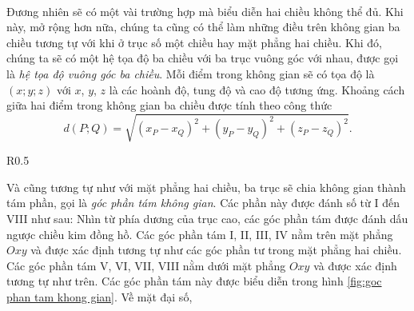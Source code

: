 \ %

Đương nhiên sẽ có một vài trường hợp mà biểu diễn hai chiều không thể đủ. Khi này, mở rộng hơn nữa, chúng ta cũng có thể làm những điều trên không gian ba chiều tương tự với khi ở trục số một chiều hay mặt phẳng hai chiều. Khi đó, chúng ta sẽ có một hệ tọa độ ba chiều với ba trục vuông góc với nhau, được gọi là \emph{hệ tọa độ vuông góc ba chiều}. Mỗi điểm trong không gian sẽ có tọa độ là $(x;y;z)$ với $x$, $y$, $z$ là các hoành độ, tung độ và cao độ tương ứng. Khoảng cách giữa hai điểm trong không gian ba chiều được tính theo công thức $$d(P;Q)=\sqrt{(x_P-x_Q)^2+(y_P-y_Q)^2+(z_P-z_Q)^2}.$$

\begin{wrapfigure}{R}{0.5\textwidth}
   \centering
   \caption{Góc phần tám không gian}
   \label{fig:goc phan tam khong gian}
\end{wrapfigure}

Và cũng tương tự như với mặt phẳng hai chiều, ba trục sẽ chia không gian thành tám phần, gọi là \emph{góc phần tám không gian}. Các phần này được đánh số từ I đến VIII như sau: Nhìn từ phía dương của trục cao, các góc phần tám được đánh dấu ngược chiều kim đồng hồ. Các góc phần tám I, II, III, IV nằm trên mặt phẳng $Oxy$ và được xác định tương tự như các góc phần tư trong mặt phẳng hai chiều. Các góc phần tám V, VI, VII, VIII nằm dưới mặt phẳng $Oxy$ và được xác định tương tự như trên. Các góc phần tám này được biểu diễn trong hình \ref{fig:goc phan tam khong gian}. Về mặt đại số, 

